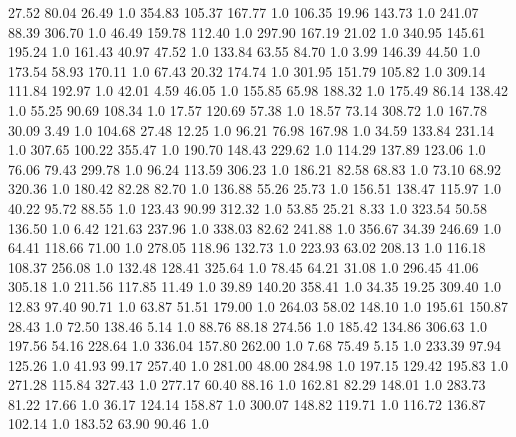      27.52     80.04     26.49  1.0
    354.83    105.37    167.77  1.0
    106.35     19.96    143.73  1.0
    241.07     88.39    306.70  1.0
     46.49    159.78    112.40  1.0
    297.90    167.19     21.02  1.0
    340.95    145.61    195.24  1.0
    161.43     40.97     47.52  1.0
    133.84     63.55     84.70  1.0
      3.99    146.39     44.50  1.0
    173.54     58.93    170.11  1.0
     67.43     20.32    174.74  1.0
    301.95    151.79    105.82  1.0
    309.14    111.84    192.97  1.0
     42.01      4.59     46.05  1.0
    155.85     65.98    188.32  1.0
    175.49     86.14    138.42  1.0
     55.25     90.69    108.34  1.0
     17.57    120.69     57.38  1.0
     18.57     73.14    308.72  1.0
    167.78     30.09      3.49  1.0
    104.68     27.48     12.25  1.0
     96.21     76.98    167.98  1.0
     34.59    133.84    231.14  1.0
    307.65    100.22    355.47  1.0
    190.70    148.43    229.62  1.0
    114.29    137.89    123.06  1.0
     76.06     79.43    299.78  1.0
     96.24    113.59    306.23  1.0
    186.21     82.58     68.83  1.0
     73.10     68.92    320.36  1.0
    180.42     82.28     82.70  1.0
    136.88     55.26     25.73  1.0
    156.51    138.47    115.97  1.0
     40.22     95.72     88.55  1.0
    123.43     90.99    312.32  1.0
     53.85     25.21      8.33  1.0
    323.54     50.58    136.50  1.0
      6.42    121.63    237.96  1.0
    338.03     82.62    241.88  1.0
    356.67     34.39    246.69  1.0
     64.41    118.66     71.00  1.0
    278.05    118.96    132.73  1.0
    223.93     63.02    208.13  1.0
    116.18    108.37    256.08  1.0
    132.48    128.41    325.64  1.0
     78.45     64.21     31.08  1.0
    296.45     41.06    305.18  1.0
    211.56    117.85     11.49  1.0
     39.89    140.20    358.41  1.0
     34.35     19.25    309.40  1.0
     12.83     97.40     90.71  1.0
     63.87     51.51    179.00  1.0
    264.03     58.02    148.10  1.0
    195.61    150.87     28.43  1.0
     72.50    138.46      5.14  1.0
     88.76     88.18    274.56  1.0
    185.42    134.86    306.63  1.0
    197.56     54.16    228.64  1.0
    336.04    157.80    262.00  1.0
      7.68     75.49      5.15  1.0
    233.39     97.94    125.26  1.0
     41.93     99.17    257.40  1.0
    281.00     48.00    284.98  1.0
    197.15    129.42    195.83  1.0
    271.28    115.84    327.43  1.0
    277.17     60.40     88.16  1.0
    162.81     82.29    148.01  1.0
    283.73     81.22     17.66  1.0
     36.17    124.14    158.87  1.0
    300.07    148.82    119.71  1.0
    116.72    136.87    102.14  1.0
    183.52     63.90     90.46  1.0
